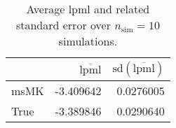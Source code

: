 \begin{table}[H]

\caption{Average lpml and related standard error over $n_{\text{sim}} = 10$ simulations.}
\centering
\begin{tabular}[t]{lrr}
\toprule
  & $\overbar{\text{lpml}}$ & $\text{sd}(\overbar{\text{lpml}})$\\
\midrule
msMK & -3.409642 & 0.0276005\\
True & -3.389846 & 0.0290640\\
\bottomrule
\end{tabular}
\end{table}